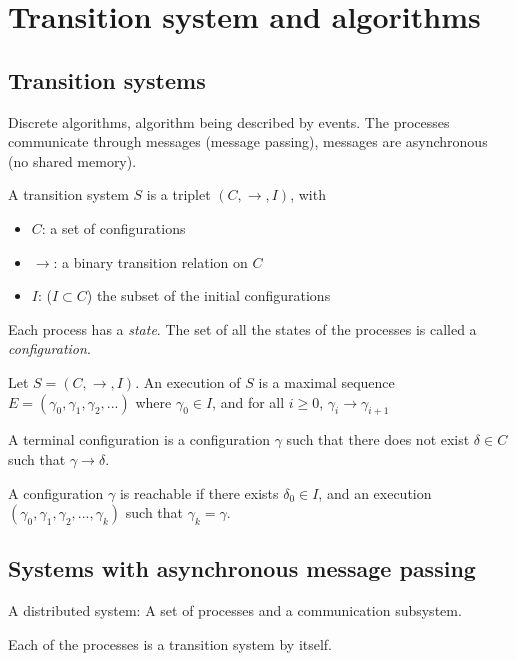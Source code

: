 \section{Transition system and algorithms}
\subsection{Transition systems}
Discrete algorithms, algorithm being described by events.
The processes communicate through messages (message passing), messages are asynchronous (no shared memory).

\begin{defi}
A transition system $S$ is a triplet $(C,\to,I)$, with 
\begin{itemize}
\item $C$: a set of configurations
\item $\to$: a binary transition relation on $C$
\item $I$: ($I\subset C$) the subset of the initial      configurations
\end{itemize}
\end{defi}

Each process has a \emph{state}. The set of all the states of the processes is called a \emph{configuration}.

\begin{defi}[Execution]
Let $S=(C,\to,I)$. An execution of $S$ is a maximal sequence $E=(\gamma_0,\gamma_1,\gamma_2,...)$ where $\gamma_0 \in I$, and for all $i\geq 0$, $\gamma_i \to \gamma_{i+1}$
\end{defi}

A terminal configuration is a configuration $\gamma$ such that there does not exist $\delta \in C$ 
such that $\gamma \to \delta$.

\begin{defi}
A configuration $\gamma$ is reachable if there exists $\delta_0 \in I$, and an execution $(\gamma_0,\gamma_1,\gamma_2,...,\gamma_k)$ such that $\gamma_k = \gamma$.
\end{defi}

\subsection{Systems with asynchronous message passing}

A distributed system: A set of processes and a communication subsystem.

Each of the processes is a transition system by itself.

